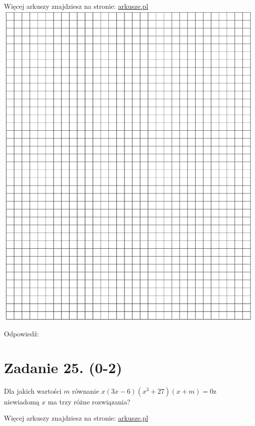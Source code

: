 \documentclass[10pt]{article}
\begin{document}
Więcej arkuszy znajdziesz na stronie: \href{http://arkusze.pl}{arkusze.pl}\\
\includegraphics[max width=\textwidth, center]{2024_11_21_72158d4a4efa7dd894bcg-12}

Odpowiedź:

\section*{Zadanie 25. (0-2)}
Dla jakich wartości \(m\) równanie \(x(3 x-6)\left(x^{3}+27\right)(x+m)=0 \mathrm{z}\) niewiadomą \(x\) ma trzy różne rozwiązania?

Więcej arkuszy znajdziesz na stronie: \href{http://arkusze.pl}{arkusze.pl}
\end{document}
